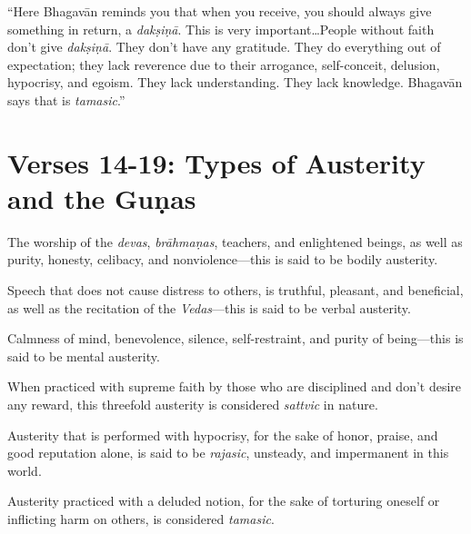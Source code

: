 \enquote{Here Bhagavān reminds you that when you receive, you should always give something in return, a \textit{dakṣiṇā}. This is very important\ldots People without faith don’t give \textit{dakṣiṇā}. They don’t have any gratitude. They do everything out of expectation; they lack reverence due to their arrogance, self-conceit, delusion, hypocrisy, and egoism. They lack understanding. They lack knowledge. Bhagavān says that is \textit{tamasic}.}

\section{Verses 14-19: Types of Austerity and the Guṇas}\label{sec-verses-14-19-types-of-austerity-and-the-gunas}

{The worship of the \textit{devas}, \textit{brāhmaṇas}, teachers, and enlightened beings, as well as purity, honesty, celibacy, and nonviolence---this is said to be bodily austerity.}

{Speech that does not cause distress to others, is truthful, pleasant, and beneficial, as well as the recitation of the \textit{Vedas}---this is said to be verbal austerity.}

{Calmness of mind, benevolence, silence, self-restraint, and purity of being---this is said to be mental austerity.}

{When practiced with supreme faith by those who are disciplined and don't desire any reward, this threefold austerity is considered \textit{sattvic} in nature.}

{Austerity that is performed with hypocrisy, for the sake of honor, praise, and good reputation alone, is said to be \textit{rajasic}, unsteady, and impermanent in this world.}

{Austerity practiced with a deluded notion, for the sake of torturing oneself or inflicting harm on others, is considered \textit{tamasic}.}

